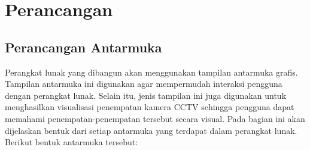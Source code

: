\chapter{Perancangan}

\section{Perancangan Antarmuka}
\label{sec:perancangan_antarmuka}
Perangkat lunak yang dibangun akan menggunakan tampilan antarmuka grafis. Tampilan antarmuka ini digunakan agar mempermudah interaksi pengguna dengan perangkat lunak. Selain itu, jenis tampilan ini juga digunakan untuk menghasilkan visualisasi penempatan kamera CCTV sehingga pengguna dapat memahami penempatan-penempatan tersebut secara visual. Pada bagian ini akan dijelaskan bentuk dari setiap antarmuka yang terdapat dalam perangkat lunak. Berikut bentuk antarmuka tersebut:

